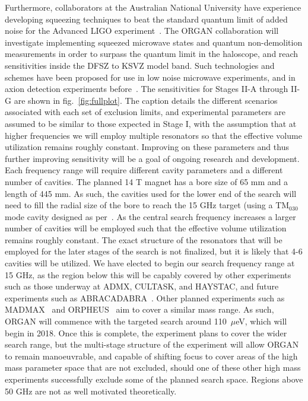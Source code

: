 \documentclass[preprint]{elsarticle}
\begin{document}
Furthermore, collaborators at the Australian National University have experience developing squeezing techniques to beat the standard quantum limit of added noise for the Advanced LIGO experiment~\cite{ANULIGO}. The ORGAN collaboration will investigate implementing squeezed microwave states and quantum non-demolition measurements in order to surpass the quantum limit in the haloscope, and reach sensitivities inside the DFSZ to KSVZ model band. Such technologies and schemes have been proposed for use in low noise microwave experiments, and in axion detection experiments before~\cite{Nobel2012,AxionQND3,AxionQND1,AxionQND2}. The sensitivities for Stages II-A through II-G are shown in fig.~\ref{fig:fullplot}. The caption details the different scenarios associated with each set of exclusion limits, and experimental parameters are assumed to be similar to those expected in Stage I, with the assumption that at higher frequencies we will employ multiple resonators so that the effective volume utilization remains roughly constant. Improving on these parameters and thus further improving sensitivity will be a goal of ongoing research and development.
Each frequency range will require different cavity parameters and a different number of cavities. The planned 14 T magnet has a bore size of 65 mm and a length of 445 mm. As such, the cavities used for the lower end of the search will need to fill the radial size of the bore to reach the 15 GHz target (using a TM$_{030}$ mode cavity designed as per~\cite{DielectricSupermode}. As the central search frequency increases a larger number of cavities will be employed such that the effective volume utilization remains roughly constant. The exact structure of the resonators that will be employed for the later stages of the search is not finalized, but it is likely that 4-6 cavities will be utilized.
We have elected to begin our search frequency range at 15 GHz, as the region below this will be capably covered by other experiments such as those underway at ADMX, CULTASK, and HAYSTAC, and future experiments such as ABRACADABRA~\cite{ABRACADABRA}. Other planned experiments such as MADMAX~\cite{MADMAX} and ORPHEUS~\cite{Orpheus} aim to cover a similar mass range. As such, ORGAN will commence with the targeted search around 110~$\mu$eV, which will begin in 2018. Once this is complete, the experiment plans to cover the wider search range, but the multi-stage structure of the experiment will allow ORGAN to remain manoeuvrable, and capable of shifting focus to cover areas of the high mass parameter space that are not excluded, should one of these other high mass experiments successfully exclude some of the planned search space. Regions above 50 GHz are not as well motivated theoretically.
\end{document}
